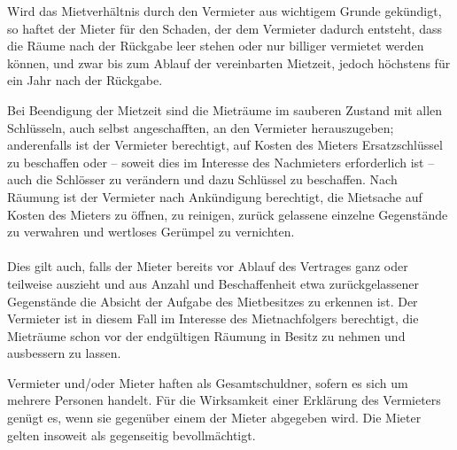 \documentclass{scrreprt}[12pt,a4paper,twoside,duplex]
\begin{document}
\begin{contract}

Wird das Mietverhältnis durch den Vermieter aus wichtigem Grunde gekündigt, so
haftet der Mieter für den Schaden, der dem Vermieter dadurch entsteht, dass die
Räume nach der Rückgabe leer stehen oder nur billiger vermietet werden können,
und zwar bis zum Ablauf der vereinbarten Mietzeit, jedoch höchstens für ein Jahr
nach der Rückgabe.
\end{contract}

\begin{contract}

Bei Beendigung der Mietzeit sind die Mieträume im sauberen Zustand mit allen
Schlüsseln, auch selbst angeschafften, an den Vermieter herauszugeben;
anderenfalls ist der Vermieter berechtigt, auf Kosten des Mieters
Ersatzschlüssel zu beschaffen oder -- soweit dies im Interesse des Nachmieters
erforderlich ist -- auch die Schlösser zu verändern und dazu Schlüssel zu
beschaffen. Nach Räumung ist der Vermieter nach Ankündigung berechtigt, die
Mietsache auf Kosten des Mieters zu öffnen, zu reinigen, zurück gelassene
einzelne Gegenstände zu verwahren und wertloses Gerümpel zu vernichten.\\
\\
Dies gilt auch, falls der Mieter bereits vor Ablauf des Vertrages ganz oder
teilweise auszieht und aus Anzahl und Beschaffenheit etwa zurückgelassener
Gegenstände die Absicht der Aufgabe des Mietbesitzes zu erkennen ist. Der
Vermieter ist in diesem Fall im Interesse des Mietnachfolgers berechtigt, die
Mieträume schon vor der endgültigen Räumung in Besitz zu nehmen und ausbessern
zu lassen.

\end{contract}

\begin{contract}
Vermieter und/oder Mieter haften als Gesamtschuldner, sofern es sich um mehrere
Personen handelt. Für die Wirksamkeit einer Erklärung des Vermieters genügt es,
wenn sie gegenüber einem der Mieter abgegeben wird. Die Mieter gelten insoweit
als gegenseitig bevollmächtigt.
\end{contract}
\end{document}
